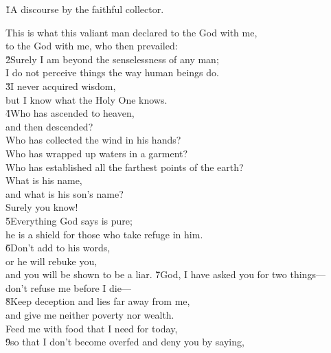 \v{1}A discourse by the faithful collector.

\begin{poetry}
\poeml This is what this valiant man declared to the God with me, \\
\poemll    to the God with me, who then prevailed: \\
\poeml \v{2}Surely I am beyond the senselessness of any man; \\
\poemll    I do not perceive things the way human beings do. \\
\poeml \v{3}I never acquired wisdom, \\
\poemll    but I know what the Holy One knows. \\
\poeml \v{4}Who has ascended to heaven, \\
\poemll    and then descended? \\
\poemlll       Who has collected the wind in his hands? \\
\poeml Who has wrapped up waters in a garment? \\
\poemll    Who has established all the farthest points of the earth? \\
\poeml What is his name, \\
\poemll    and what is his son's name? \\
\poemlll       Surely you know! \\
\poeml \v{5}Everything God says is pure; \\
\poemll    he is a shield for those who take refuge in him. \\
\poeml \v{6}Don't add to his words, \\
\poemll    or he will rebuke you, \\
\poemlll       and you will be shown to be a liar.
\poeml \v{7}God, I have asked you for two things--- \\
\poemll    don't refuse me before I die--- \\
\poeml \v{8}Keep deception and lies far away from me, \\
\poemll    and give me neither poverty nor wealth. \\
\poeml Feed me with food that I need for today, \\
\poeml \v{9}so that I don't become overfed and deny you by saying, \\

\end{poetry}
